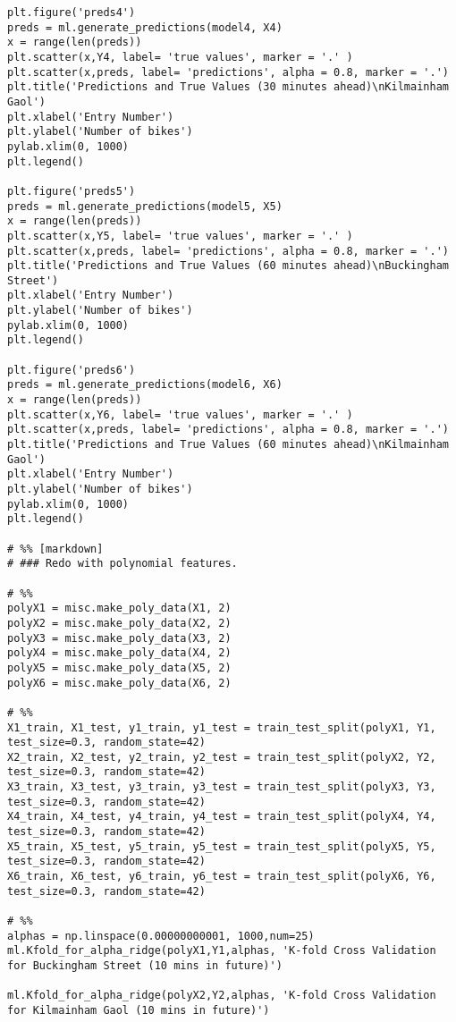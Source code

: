 \begin{verbatim}
plt.figure('preds4')
preds = ml.generate_predictions(model4, X4)
x = range(len(preds))
plt.scatter(x,Y4, label= 'true values', marker = '.' )
plt.scatter(x,preds, label= 'predictions', alpha = 0.8, marker = '.')
plt.title('Predictions and True Values (30 minutes ahead)\nKilmainham Gaol')
plt.xlabel('Entry Number')
plt.ylabel('Number of bikes')
pylab.xlim(0, 1000)
plt.legend()

plt.figure('preds5')
preds = ml.generate_predictions(model5, X5)
x = range(len(preds))
plt.scatter(x,Y5, label= 'true values', marker = '.' )
plt.scatter(x,preds, label= 'predictions', alpha = 0.8, marker = '.')
plt.title('Predictions and True Values (60 minutes ahead)\nBuckingham Street')
plt.xlabel('Entry Number')
plt.ylabel('Number of bikes')
pylab.xlim(0, 1000)
plt.legend()

plt.figure('preds6')
preds = ml.generate_predictions(model6, X6)
x = range(len(preds))
plt.scatter(x,Y6, label= 'true values', marker = '.' )
plt.scatter(x,preds, label= 'predictions', alpha = 0.8, marker = '.')
plt.title('Predictions and True Values (60 minutes ahead)\nKilmainham Gaol')
plt.xlabel('Entry Number')
plt.ylabel('Number of bikes')
pylab.xlim(0, 1000)
plt.legend()

# %% [markdown]
# ### Redo with polynomial features.

# %%
polyX1 = misc.make_poly_data(X1, 2)
polyX2 = misc.make_poly_data(X2, 2)
polyX3 = misc.make_poly_data(X3, 2)
polyX4 = misc.make_poly_data(X4, 2)
polyX5 = misc.make_poly_data(X5, 2)
polyX6 = misc.make_poly_data(X6, 2)

# %%
X1_train, X1_test, y1_train, y1_test = train_test_split(polyX1, Y1, test_size=0.3, random_state=42)
X2_train, X2_test, y2_train, y2_test = train_test_split(polyX2, Y2, test_size=0.3, random_state=42)
X3_train, X3_test, y3_train, y3_test = train_test_split(polyX3, Y3, test_size=0.3, random_state=42)
X4_train, X4_test, y4_train, y4_test = train_test_split(polyX4, Y4, test_size=0.3, random_state=42)
X5_train, X5_test, y5_train, y5_test = train_test_split(polyX5, Y5, test_size=0.3, random_state=42)
X6_train, X6_test, y6_train, y6_test = train_test_split(polyX6, Y6, test_size=0.3, random_state=42)

# %%
alphas = np.linspace(0.00000000001, 1000,num=25)
ml.Kfold_for_alpha_ridge(polyX1,Y1,alphas, 'K-fold Cross Validation for Buckingham Street (10 mins in future)')

ml.Kfold_for_alpha_ridge(polyX2,Y2,alphas, 'K-fold Cross Validation for Kilmainham Gaol (10 mins in future)')


\end{verbatim}
